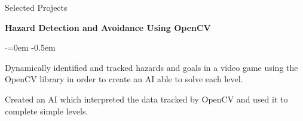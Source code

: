 \documentclass{resume} %
\begin{document}
\begin{rSection}{Selected Projects}

{\bf Hazard Detection and Avoidance Using OpenCV}
\begin{list}{$\cdot$}{\leftmargin=0em} %
   \itemsep -0.5em \vspace{-0.5em} %
    \item Dynamically identified and tracked hazards and goals in a video game using the OpenCV library in order to create an AI able to solve each level.
    \item Created an AI which interpreted the data tracked by OpenCV and used it to complete simple levels.
\end{list}

\end{rSection}






\end{document}
